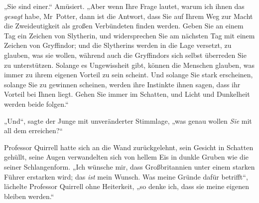 „Sie sind einer.“ Amüsiert. „Aber wenn Ihre Frage lautet, warum ich ihnen das \emph{gesagt} habe, Mr~Potter, dann ist die Antwort, dass Sie auf Ihrem Weg zur Macht die Zweideutigkeit als großen Verbündeten finden werden. Geben Sie an einem Tag ein Zeichen von Slytherin, und widersprechen Sie am nächsten Tag mit einem Zeichen von Gryffindor; und die Slytherins werden in die Lage versetzt, zu glauben, was sie wollen, während auch die Gryffindors sich selbst überreden Sie zu unterstützen. Solange es Ungewissheit gibt, können die Menschen glauben, was immer zu ihrem eigenen Vorteil zu sein scheint. Und solange Sie stark erscheinen, solange Sie zu gewinnen scheinen, werden ihre Instinkte ihnen sagen, dass ihr Vorteil bei Ihnen liegt. Gehen Sie immer im Schatten, und Licht und Dunkelheit werden beide folgen.“

„Und“, sagte der Junge mit unveränderter Stimmlage, „was genau wollen \emph{Sie} mit all dem erreichen?“

Professor Quirrell hatte sich an die Wand zurückgelehnt, sein Gesicht in Schatten gehüllt, seine Augen verwandelten sich von hellem Eis in dunkle Gruben wie die seiner Schlangenform. „Ich wünsche mir, dass Großbritannien unter einem starken Führer erstarken wird; das \emph{ist} mein Wunsch. Was meine Gründe dafür betrifft“, lächelte Professor Quirrell ohne Heiterkeit, „so denke ich, dass sie meine eigenen bleiben werden.“

